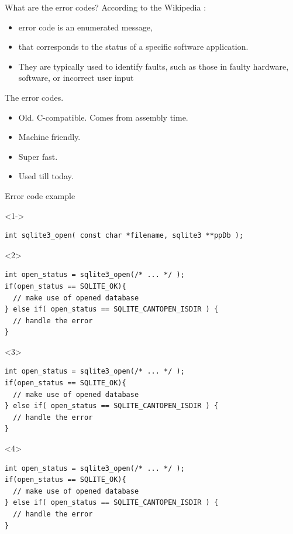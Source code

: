 \documentclass[10pt]{beamer}
\begin{document}
\begin{frame}{What are the error codes?}
	According to the \alert{Wikipedia} :
	\begin{itemize}[<+- | alert@+>]
		\item error code is an enumerated message,
		\item that corresponds to the status of a specific software application.
		\item They are typically used to identify faults, such as those in faulty hardware, software, or incorrect user input
	\end{itemize}
\end{frame}

\begin{frame}{The error codes.}
	\begin{itemize}[<+- | alert@+>]
		\item Old. C-compatible. Comes from assembly time.
		\item Machine friendly.
		\item Super fast.
		\item Used till today.
	\end{itemize}
\end{frame}

\begin{frame}[fragile]{Error code example}
	\begin{onlyenv}<1->
	\begin{verbatim}
int sqlite3_open( const char *filename, sqlite3 **ppDb );
	\end{verbatim}
	\end{onlyenv}
	
	\begin{onlyenv}
	\hrulefill
	
	\begin{verbatim}
int open_status = sqlite3_open(/* ... */ );
if(open_status == SQLITE_OK){
  // make use of opened database
} else if( open_status == SQLITE_CANTOPEN_ISDIR ) {
  // handle the error
}
	\end{verbatim}
	\end{onlyenv}
	
	\begin{onlyenv}
	\hrulefill

	\begin{verbatim}
int open_status = sqlite3_open(/* ... */ );
if(open_status == SQLITE_OK){
  // make use of opened database
} else if( open_status == SQLITE_CANTOPEN_ISDIR ) {
  // handle the error
}
	\end{verbatim}

	\end{onlyenv}
	\begin{onlyenv}
	\hrulefill

	\begin{verbatim}
int open_status = sqlite3_open(/* ... */ );
if(open_status == SQLITE_OK){
  // make use of opened database
} else if( open_status == SQLITE_CANTOPEN_ISDIR ) {
  // handle the error
}
\end{verbatim}
	\end{onlyenv}

\end{frame}
\end{document}
